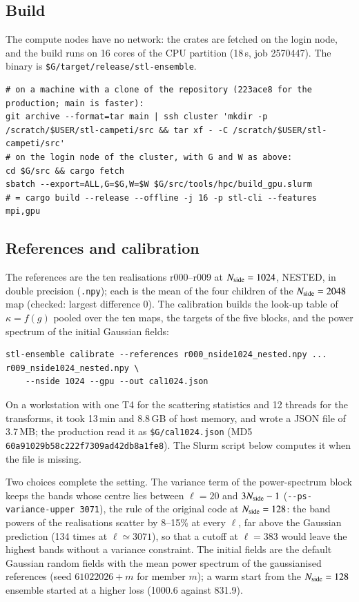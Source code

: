 \documentclass{aa}
\newcommand{\nside}{N_{\rm side}}
\begin{document}
\subsection{Build}

The compute nodes have no network: the crates are fetched on the login node, and the build runs on 16 cores of the CPU partition (18\,s, job 2570447). The binary is \texttt{\$G/target/release/stl-ensemble}.
\begin{lstlisting}
# on a machine with a clone of the repository (223ace8 for the production; main is faster):
git archive --format=tar main | ssh cluster 'mkdir -p /scratch/$USER/stl-campeti/src && tar xf - -C /scratch/$USER/stl-campeti/src'
# on the login node of the cluster, with G and W as above:
cd $G/src && cargo fetch
sbatch --export=ALL,G=$G,W=$W $G/src/tools/hpc/build_gpu.slurm
# = cargo build --release --offline -j 16 -p stl-cli --features mpi,gpu
\end{lstlisting}

\subsection{References and calibration}

The references are the ten realisations r000--r009 at $\nside=1024$, NESTED, in double precision (\texttt{.npy}); each is the mean of the four children of the $\nside=2048$ map (checked: largest difference 0). The calibration builds the look-up table of $\kappa=f(g)$ pooled over the ten maps, the targets of the five blocks, and the power spectrum of the initial Gaussian fields:
\begin{lstlisting}
stl-ensemble calibrate --references r000_nside1024_nested.npy ... r009_nside1024_nested.npy \
    --nside 1024 --gpu --out cal1024.json
\end{lstlisting}
On a workstation with one T4 for the scattering statistics and 12 threads for the transforms, it took 13\,min and 8.8\,GB of host memory, and wrote a JSON file of 3.7\,MB; the production read it as \texttt{\$G/cal1024.json} (MD5 \texttt{60a91029b58c222f7309ad42db8a1fe8}). The Slurm script below computes it when the file is missing.

Two choices complete the setting. The variance term of the power-spectrum block keeps the bands whose centre lies between $\ell=20$ and $3\nside-1$ (\texttt{-{}-ps-variance-upper 3071}), the rule of the original code at $\nside=128$: the band powers of the realisations scatter by 8--15\% at every $\ell$, far above the Gaussian prediction (134 times at $\ell\simeq3071$), so that a cutoff at $\ell=383$ would leave the highest bands without a variance constraint. The initial fields are the default Gaussian random fields with the mean power spectrum of the gaussianised references (seed $61022026+m$ for member $m$); a warm start from the $\nside=128$ ensemble started at a higher loss (1000.6 against 831.9).
\end{document}
